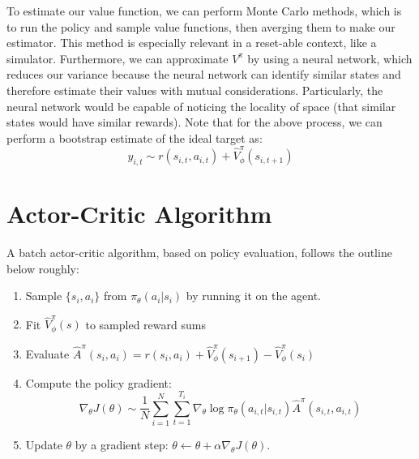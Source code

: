 To estimate our value function, we can perform Monte Carlo methods, which is to run the policy and sample value functions, then averging them to make our estimator.
This method is especially relevant in a reset-able context, like a simulator.
Furthermore, we can approximate $V^\pi$ by using a neural network, which reduces our variance because the neural network can identify similar states and therefore estimate their values with mutual considerations.
Particularly, the neural network would be capable of noticing the locality of space (that similar states would have similar rewards).
Note that for the above process, we can perform a bootstrap estimate of the ideal target as:
\[
    y_{i,t} \sim r(s_{i,t}, a_{i,t}) + \hat{V}_\phi^\pi (s_{i,t+1})
\]

\section{Actor-Critic Algorithm}
A batch actor-critic algorithm, based on policy evaluation, follows the outline below roughly:
\begin{enumerate}
    \item Sample $\{s_i, a_i\}$ from $\pi_\theta(a_i | s_i)$ by running it on the agent.
    \item Fit $\hat{V}_\phi^\pi (s)$ to sampled reward sums
    \item Evaluate $\hat{A}^\pi (s_i, a_i) = r(s_i, a_i) + \hat{V}_\phi^\pi (s_{i+1}) - \hat{V}_\phi^\pi (s_i)$
    \item Compute the policy gradient:
        \[
            \nabla_\theta J(\theta) \sim \frac{1}{N} \sum_{i=1}^N \sum_{t=1}^{T_i} \nabla_\theta \log \pi_\theta(a_{i,t} | s_{i,t}) \hat{A}^\pi(s_{i,t}, a_{i,t})
        \]
    \item Update $\theta$ by a gradient step: $\theta \leftarrow \theta + \alpha \nabla_\theta J(\theta)$.
\end{enumerate}

